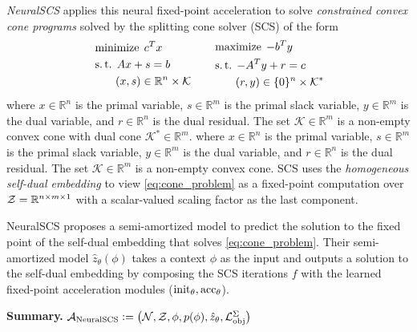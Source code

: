 \documentclass[twoside,11pt]{article}
\begin{document}
\emph{NeuralSCS} \citep{venkataraman2021neural} applies this
neural fixed-point acceleration to solve
\emph{constrained convex cone programs}
solved by the splitting cone solver (SCS)
\citep{o2016conic}
of the form
\begin{equation}
  \label{eq:cone_problem}
\begin{aligned}[c]
  & \operatorname*{minimize}\; c^{T}x \\
  & \operatorname*{s.t.} \; Ax + s = b \\
  & \qquad (x,s) \in \mathbb{R}^n \times \mathcal{K}
\end{aligned}
\qquad
\begin{aligned}[c]
  & \operatorname*{maximize}\; -b^{T}y \\
  & \operatorname*{s.t.}\; -A^{T}y + r = c \\
  & \qquad (r,y) \in \{0\}^n \times \mathcal{K}^*
\end{aligned}
\end{equation}
where $x \in \mathbb{R}^n$ is the primal variable, $s \in
\mathbb{R}^m$ is the primal slack variable, $y \in \mathbb{R}^m$ is
the dual variable, and $r \in \mathbb{R}^n$ is the dual residual. The
set $\mathcal{K} \in \mathbb{R}^m$ is a non-empty convex cone with
dual cone $\mathcal{K}^* \in \mathbb{R}^m$.
where $x \in \mathbb{R}^n$ is the primal variable, $s \in
\mathbb{R}^m$ is the primal slack variable, $y \in \mathbb{R}^m$ is
the dual variable, and $r \in \mathbb{R}^n$ is the dual residual. The
set $\mathcal{K} \in \mathbb{R}^m$ is a non-empty convex cone.
SCS uses the \emph{homogeneous self-dual embedding} to view
\cref{eq:cone_problem} as a fixed-point computation
over ${\mathcal{Z}}=\mathbb{R}^{n\times m\times 1}$ with a scalar-valued scaling factor
as the last component.

NeuralSCS proposes a semi-amortized model to predict
the solution to the fixed point of the self-dual embedding
that solves \cref{eq:cone_problem}.
Their semi-amortized model $\hat z_\theta(\phi)$ takes
a context $\phi$ as the input and outputs a solution to the
self-dual embedding by composing the SCS iterations $f$ with
the learned fixed-point acceleration modules
(${\rm init}_\theta,{\rm acc}_\theta$).

\textbf{Summary.}
${\mathcal{A}}_{\rm NeuralSCS}\vcentcolon=\left({\mathcal{N}}, {\mathcal{Z}}, \phi, p(\phi), \hat z_\theta, {\mathcal{L}}_{\rm obj}^\Sigma\right)$
\end{document}
